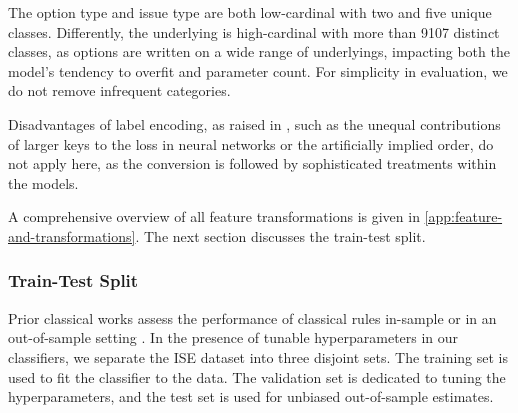 The option type and issue type are both low-cardinal with two and five unique classes. Differently, the underlying is high-cardinal with more than \num{9107} distinct classes, as options are written on a wide range of underlyings, impacting both the model's tendency to overfit and parameter count. For simplicity in evaluation, we do not remove infrequent categories.

Disadvantages of label encoding, as raised in \textcite[][12]{hancockSurveyCategoricalData2020}, such as the unequal contributions of larger keys to the loss in neural networks or the artificially implied order, do not apply here, as the conversion is followed by sophisticated treatments within the models.

A comprehensive overview of all feature transformations is given in \cref{app:feature-and-transformations}. The next section discusses the train-test split.

\subsubsection{Train-Test Split}\label{sec:train-test-split}

Prior classical works assess the performance of classical rules in-sample \autocite[cp.][541]{ellisAccuracyTradeClassification2000} or in an out-of-sample setting \autocites[cp.][9]{grauerOptionTradeClassification2022}[][3814--3815]{chakrabartyTradeClassificationAlgorithms2007}. In the presence of tunable hyperparameters in our classifiers, we separate the \gls{ISE} dataset into three disjoint sets. The training set is used to fit the classifier to the data. The validation set is dedicated to tuning the hyperparameters, and the test set is used for unbiased out-of-sample estimates.

